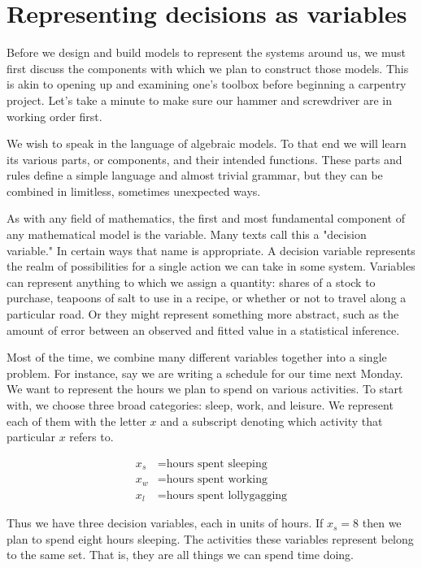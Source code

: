 \section{Representing decisions as variables}

Before we design and build models to represent the systems around us, we must first discuss the components with which we plan to construct those models. This is akin to opening up and examining one's toolbox before beginning a carpentry project. Let's take a minute to make sure our hammer and screwdriver are in working order first.

We wish to speak in the language of algebraic models. To that end we will learn its various parts, or components, and their intended functions. These parts and rules define a simple language and almost trivial grammar, but they can be combined in limitless, sometimes unexpected ways.

As with any field of mathematics, the first and most fundamental component of any mathematical model is the variable. Many texts call this a "decision variable." In certain ways that name is appropriate. A decision variable represents the realm of possibilities for a single action we can take in some system. Variables can represent anything to which we assign a quantity: shares of a stock to purchase, teapoons of salt to use in a recipe, or whether or not to travel along a particular road. Or they might represent something more abstract, such as the amount of error between an observed and fitted value in a statistical inference.

Most of the time, we combine many different variables together into a single problem. For instance, say we are writing a schedule for our time next Monday. We want to represent the hours we plan to spend on various activities. To start with, we choose three broad categories: sleep, work, and leisure. We represent each of them with the letter $x$ and a subscript denoting which activity that particular $x$ refers to.

$$
\begin{aligned}
	x_s &= \text{hours spent sleeping} \\
	x_w &= \text{hours spent working} \\
	x_l &= \text{hours spent lollygagging}
\end{aligned}
$$

Thus we have three decision variables, each in units of hours. If $x_s = 8$ then we plan to spend eight hours sleeping. The activities these variables represent belong to the same set. That is, they are all things we can spend time doing.